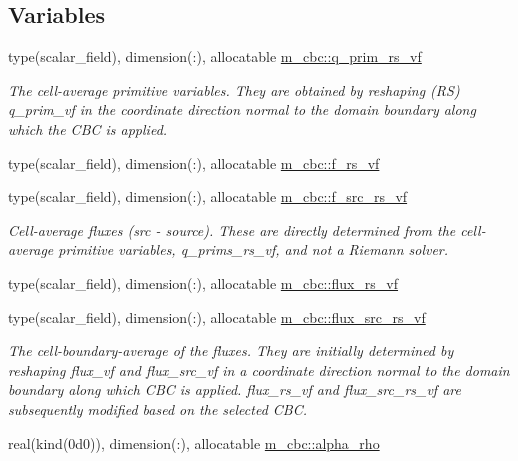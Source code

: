 \subsection*{Variables}
\begin{DoxyCompactItemize}
\item 
type(scalar\+\_\+field), dimension(\+:), allocatable \hyperlink{namespacem__cbc_a12e2d4feb2b8425b8f2270a8da529555}{m\+\_\+cbc\+::q\+\_\+prim\+\_\+rs\+\_\+vf}
\begin{DoxyCompactList}\small\item\em The cell-\/average primitive variables. They are obtained by reshaping (RS) q\+\_\+prim\+\_\+vf in the coordinate direction normal to the domain boundary along which the C\+BC is applied. \end{DoxyCompactList}\item 
type(scalar\+\_\+field), dimension(\+:), allocatable \hyperlink{namespacem__cbc_a9023ac4f88b32e7d88ca8fadb649b84f}{m\+\_\+cbc\+::f\+\_\+rs\+\_\+vf}
\item 
type(scalar\+\_\+field), dimension(\+:), allocatable \hyperlink{namespacem__cbc_ab079ec31add26b8d5f591b3cb5e5b88f}{m\+\_\+cbc\+::f\+\_\+src\+\_\+rs\+\_\+vf}
\begin{DoxyCompactList}\small\item\em Cell-\/average fluxes (src -\/ source). These are directly determined from the cell-\/average primitive variables, q\+\_\+prims\+\_\+rs\+\_\+vf, and not a Riemann solver. \end{DoxyCompactList}\item 
type(scalar\+\_\+field), dimension(\+:), allocatable \hyperlink{namespacem__cbc_abbb35cbd4d0951e9231865bd4120e682}{m\+\_\+cbc\+::flux\+\_\+rs\+\_\+vf}
\item 
type(scalar\+\_\+field), dimension(\+:), allocatable \hyperlink{namespacem__cbc_a5075a07fe184dfe7d109f6b4e14f7302}{m\+\_\+cbc\+::flux\+\_\+src\+\_\+rs\+\_\+vf}
\begin{DoxyCompactList}\small\item\em The cell-\/boundary-\/average of the fluxes. They are initially determined by reshaping flux\+\_\+vf and flux\+\_\+src\+\_\+vf in a coordinate direction normal to the domain boundary along which C\+BC is applied. flux\+\_\+rs\+\_\+vf and flux\+\_\+src\+\_\+rs\+\_\+vf are subsequently modified based on the selected C\+BC. \end{DoxyCompactList}\item 
real(kind(0d0)), dimension(\+:), allocatable \hyperlink{namespacem__cbc_a23d4bcbedc528222237094361a4ff43f}{m\+\_\+cbc\+::alpha\+\_\+rho}

\end{DoxyCompactItemize}

